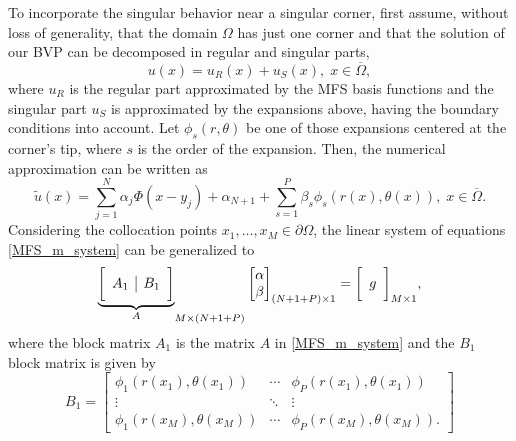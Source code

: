To incorporate the singular behavior near a singular corner, first assume, without loss of generality, that the domain \(\Omega\) has just one corner and that the solution of our \ac{BVP} can be decomposed in regular and singular parts,
\[
    u(x) = u_R(x) + u_S(x), \; x \in \overline{\Omega},
\]
where \(u_R\) is the regular part approximated by the \ac{MFS} basis functions and the singular part \(u_S\) is approximated by the expansions above, having the boundary conditions into account. Let \(\phi_s(r, \theta)\) be one of those expansions centered at the corner's tip, where \(s\) is the order of the expansion. Then, the numerical approximation can be written as
\begin{equation}
    \tilde{u}(x) = \sum_{j=1}^{N}\alpha_j \Phi(x-y_j) + \alpha_{N+1} + \sum_{s=1}^{P} \beta_s \phi_s(r(x),\theta(x)), \; x \in \overline{\Omega}.
\end{equation}
Considering the collocation points \(x_1,\dots,x_M \in \partial \Omega\), the linear system of equations \eqref{MFS_m_system} can be generalized to
\begin{equation}
    {\underbrace{\bigg[ \begin{array}{c | c}
        A_1 & B_1 \\
    \end{array} \bigg]}_{A}}_{M\times(N+1+P)}
    \begin{bmatrix}
        \alpha\\
        \beta
    \end{bmatrix}_{(N+1+P)\times 1}
    =
    \bigg[ \begin{array}{c}
        g \\
    \end{array} \bigg]_{M\times 1},
\end{equation}
where the block matrix \(A_1\) is the matrix \(A\) in \eqref{MFS_m_system} and the \(B_1\) block matrix is given by
\[
    B_1=\begin{bmatrix}
        \phi_1(r(x_1), \theta(x_1)) & \cdots & \phi_P(r(x_1), \theta(x_1)) \\
        \vdots & \ddots & \vdots\\
        \phi_1(r(x_M), \theta(x_M)) & \cdots & \phi_P(r(x_M), \theta(x_M)).
    \end{bmatrix}
\]


